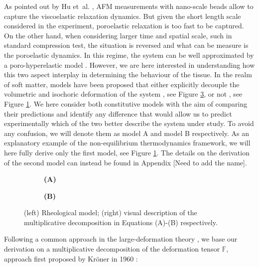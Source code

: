 \documentclass[runningheads]{llncs}
\newcommand{\F}{\ensuremath{\mathbb{F}}}
\begin{document}
As pointed out by Hu et~al. \cite{viscoporo}, AFM measurements with nano-scale beads allow to capture the viscoelastic relaxation dynamics. But given the short length scale considered in the experiment, poroelastic relaxation is too fast to be captured. On the other hand, when considering larger time and spatial scale, such in standard compression test, the situation is reversed and what can be measure is the poroelastic dynamics. In this regime, the system can be well approximated by a poro-hyperelastic model \cite{Reviewpolyel,ecm2}. However, we are here interested in understanding how this two aspect interplay in determining the behaviour of the tissue. In the realm of soft matter, models have been proposed that either explicitly decouple the volumetric and isochoric deformation of the system \cite{magneto,NGUYEN}, see Figure \ref{Model2}, or not \cite{Article1,CACCAVO2}, see Figure \ref{fig1}. We here consider both constitutive models with the aim of comparing their predictions and identify any difference that would allow us to predict experimentally which of the two better describe the system under study. To avoid any confusion, we will denote them as model A and model B respectively. As an explanatory example of the non-equilibrium thermodynamics framework, we will here fully derive only the first model, see Figure \ref{fig1}. The details on the derivation of the second model can instead be found in Appendix [Need to add the name]. 
\begin{figure}[h!]
	\begin{subfigure}{1\textwidth}
		\centering
	\def\svgwidth{0.95\linewidth}
	
	\caption*{\textbf{(A)}}
	\label{fig1}
	\end{subfigure}

\vspace{5mm}
	\begin{subfigure}{1\textwidth}
		\hspace{-10mm}
		\def\svgwidth{1.3\linewidth}
		
		\caption*{\textbf{(B)}}
		\label{Model2}
	\end{subfigure}
\vspace{5mm}
\caption{(left) Rheological model; (right) visual description of the multiplicative decomposition in Equations (A)-(B) respectively.}
\end{figure}
Following a common approach in the large-deformation theory \cite{Article1,CACCAVO2,Plasto,magneto,NGUYEN,growthtum}, we base our derivation on a multiplicative decomposition of the deformation tensor $\F$, approach first proposed by Kr\"{o}ner in 1960 \cite{kro}:
\end{document}
